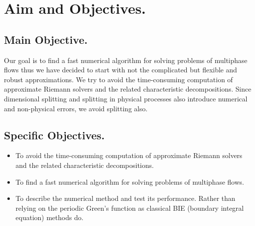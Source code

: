 \documentclass[a4paper,12pt]{article}
\begin{document}
\section{Aim and Objectives.}
\subsection{Main Objective.}
Our goal is to find a fast numerical algorithm for solving problems of multiphase flows thus we have decided to start with not the complicated but flexible and robust approximations.
\newline We try to avoid the time-consuming computation of approximate Riemann solvers and the related characteristic decompositions. Since dimensional splitting and splitting in physical processes also introduce numerical and non-physical errors, we avoid splitting also. 
\subsection{Specific Objectives.}
\begin{itemize}
\item To avoid the time-consuming computation of approximate Riemann solvers and the related characteristic decompositions.
\item To find a fast numerical algorithm for solving problems of multiphase flows. 
\item To describe the numerical method and test its performance. Rather than relying on the periodic Green's function as classical BIE (boundary integral equation) methods do.
\end{itemize}
\end{document}
